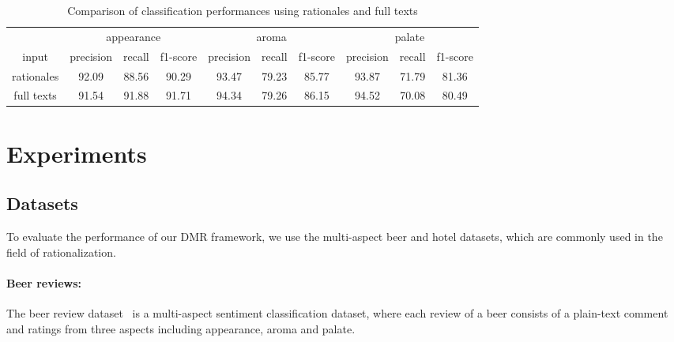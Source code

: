 \documentclass[letterpaper]{article} %
\begin{document}
\begin{table*}[!t]
\centering
\small
\begin{tabular}{c|ccc|ccc|ccc}
\hline
\multicolumn{1}{l|}{} & \multicolumn{3}{c}{appearance} & \multicolumn{3}{c|}{aroma}     & \multicolumn{3}{c}{palate}                        \\
input                 & precision & recall  & f1-score & precision & recall  & f1-score & precision & recall  & f1-score                     \\ \hline
rationales            & 92.09   & 88.56 & 90.29  & 93.47   & 79.23 & 85.77  & 93.87   & 71.79 & \multicolumn{1}{c}{81.36} \\
full texts            & 91.54   & 91.88 & 91.71  & 94.34   & 79.26 & 86.15  & 94.52   & 70.08 & \multicolumn{1}{c}{80.49} \\ \hline
\end{tabular}
\centering
\caption{\normalsize Comparison of classification performances using rationales and full texts}
    \label{tab:rationales classification}
\end{table*}


\section{Experiments}
\subsection{Datasets}
To evaluate the performance of our DMR framework, we use the multi-aspect beer and hotel datasets, which are commonly used in the field of rationalization.

\paragraph{Beer reviews:} The beer review dataset~\cite{McAuley2012LearningAA} is a multi-aspect sentiment classification dataset, where each review of a beer consists of a plain-text comment and ratings from three aspects including appearance, aroma and palate. 
\end{document}

